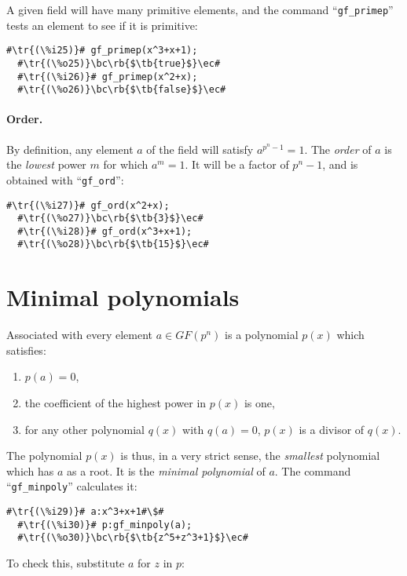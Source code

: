 \documentclass[a4paper,11pt,leqno,fleqn]{artikel3}
\newcommand{\bc}{\begin{center}}
\newcommand{\ec}{\end{center}}
\newcommand{\tr}[1]{\textcolor{red}{#1}}
\newcommand{\tb}[1]{\textcolor{blue}{#1}}
\newcommand{\rb}[1]{\raisebox{2mm}[0mm][1mm]{#1}}
\begin{document}
A given field will have many primitive elements, and the command
``\verb!gf_primep!'' tests an element to see if it is primitive:

\begin{lstlisting}[escapechar=\#]
  #\tr{(\%i25)}# gf_primep(x^3+x+1);
  #\tr{(\%o25)}\bc\rb{$\tb{true}$}\ec#
  #\tr{(\%i26)}# gf_primep(x^2+x);
  #\tr{(\%o26)}\bc\rb{$\tb{false}$}\ec#
\end{lstlisting}

\paragraph{Order.}

By definition, any element $a$ of the field will satisfy $a^{p^n-1}=1$.  The
\emph{order} of $a$ is the \emph{lowest} power $m$ for which $a^m=1$.  It will
be a factor of $p^n-1$, and is obtained with ``\verb!gf_ord!'':

\begin{lstlisting}[escapechar=\#]
  #\tr{(\%i27)}# gf_ord(x^2+x);
  #\tr{(\%o27)}\bc\rb{$\tb{3}$}\ec#
  #\tr{(\%i28)}# gf_ord(x^3+x+1);
  #\tr{(\%o28)}\bc\rb{$\tb{15}$}\ec#
\end{lstlisting}

\section*{Minimal polynomials}

Associated with every element $a\in GF(p^n)$ is a polynomial $p(x)$ which
satisfies:
\begin{enumerate}
\item $p(a)=0$,
\item the coefficient of the highest power in $p(x)$ is one,
\item for any other polynomial $q(x)$ with $q(a)=0$, $p(x)$ is a divisor of $q(x)$.
\end{enumerate}
The polynomial $p(x)$ is thus, in a very strict sense, the \emph{smallest}
polynomial which has $a$ as a root.  It is the \emph{minimal polynomial} of
$a$.  The command ``\verb!gf_minpoly!'' calculates it:

\begin{lstlisting}[escapechar=\#]
  #\tr{(\%i29)}# a:x^3+x+1#\$#
  #\tr{(\%i30)}# p:gf_minpoly(a);
  #\tr{(\%o30)}\bc\rb{$\tb{z^5+z^3+1}$}\ec#
\end{lstlisting}

To check this, substitute $a$ for $z$ in $p$:
\end{document}
